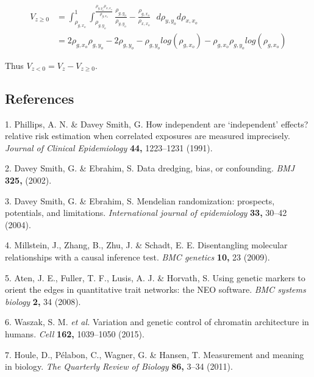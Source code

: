 \documentclass[]{article}
\begin{document}
\[
\begin{aligned}
V_{z \ge 0} & = \int^1_{\rho_{g,x_o}} \int^{\frac{\rho_{g,y_o}\rho_{x,x_o}}{\rho_{g,x_o}}}_{\rho_{g,y_o}} \frac{\rho_{g,y_o}}{\rho_{y,y_o}} - \frac{\rho_{g,x_o}}{\rho_{x,x_o}}\,\,\,\, d\rho_{y,y_o}d\rho_{x,x_o} \\
& = 2\rho_{g,x_o}\rho_{g,y_o} - 2\rho_{g,y_o} - \rho_{g,y_o}log(\rho_{g,x_o}) - \rho_{g,x_o}\rho_{g,y_o}log(\rho_{g,x_o})
\end{aligned}
\]

Thus \(V_{z < 0} = V_{z} - V_{z \geq 0}\).

\newpage

\subsection*{References}\label{references}

\hypertarget{refs}{}
\hypertarget{ref-Phillips1991}{}
1. Phillips, A. N. \& Davey Smith, G. How independent are `independent'
effects? relative risk estimation when correlated exposures are measured
imprecisely. \emph{Journal of Clinical Epidemiology} \textbf{44,}
1223--1231 (1991).

\hypertarget{ref-DaveySmith2002}{}
2. Davey Smith, G. \& Ebrahim, S. Data dredging, bias, or confounding.
\emph{BMJ} \textbf{325,} (2002).

\hypertarget{ref-DaveySmith2004}{}
3. Davey Smith, G. \& Ebrahim, S. Mendelian randomization: prospects,
potentials, and limitations. \emph{International journal of
epidemiology} \textbf{33,} 30--42 (2004).

\hypertarget{ref-Millstein2009}{}
4. Millstein, J., Zhang, B., Zhu, J. \& Schadt, E. E. Disentangling
molecular relationships with a causal inference test. \emph{BMC
genetics} \textbf{10,} 23 (2009).

\hypertarget{ref-Aten2008}{}
5. Aten, J. E., Fuller, T. F., Lusis, A. J. \& Horvath, S. Using genetic
markers to orient the edges in quantitative trait networks: the NEO
software. \emph{BMC systems biology} \textbf{2,} 34 (2008).

\hypertarget{ref-Waszak2015}{}
6. Waszak, S. M. \emph{et al.} Variation and genetic control of
chromatin architecture in humans. \emph{Cell} \textbf{162,} 1039--1050
(2015).

\hypertarget{ref-Houle2011}{}
7. Houle, D., Pélabon, C., Wagner, G. \& Hansen, T. Measurement and
meaning in biology. \emph{The Quarterly Review of Biology} \textbf{86,}
3--34 (2011).
\end{document}

